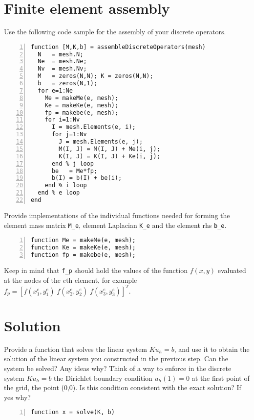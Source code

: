 \documentclass[unicode,11pt,a4paper,oneside,numbers=endperiod,openany]{scrartcl}
\begin{document}
\section{Finite element assembly}
Use the following code sample for the assembly of your discrete operators.
\begin{lstlisting}[numbers=left, numberstyle=\tiny, stepnumber=1, numbersep=10pt]
function [M,K,b] = assembleDiscreteOperators(mesh)
  N   = mesh.N;
  Ne  = mesh.Ne;
  Nv  = mesh.Nv;
  M   = zeros(N,N); K = zeros(N,N);
  b   = zeros(N,1);
  for e=1:Ne
    Me = makeMe(e, mesh);
    Ke = makeKe(e, mesh);
    fp = makebe(e, mesh);
    for i=1:Nv
      I = mesh.Elements(e, i);
      for j=1:Nv
        J = mesh.Elements(e, j);
        M(I, J) = M(I, J) + Me(i, j);
        K(I, J) = K(I, J) + Ke(i, j);
      end % j loop
      be   = Me*fp;
      b(I) = b(I) + be(i);
    end % i loop
  end % e loop
end
\end{lstlisting}
Provide implementations of the individual 
functions needed for forming the element mass matrix \lstinline+M_e+, element Laplacian \lstinline+K_e+ 
and the element rhs \lstinline+b_e+. 
\begin{lstlisting}[numbers=left, numberstyle=\tiny, stepnumber=1, numbersep=10pt, identifierstyle=\ttfamily\color{Red}\bfseries] 
function Me = makeMe(e, mesh);
function Ke = makeKe(e, mesh);
function fp = makebe(e, mesh);
\end{lstlisting}
Keep in mind that \lstinline+f_p+ should hold the values of the function $f(x,y)$
evaluated at the nodes of the $e$th element,  for example
$f_p = \left [ f(x^e_1, y^e_1) \; f(x^e_2, y^e_2) \; f(x^e_3, y^e_3)  \right ]^T$.


\section{Solution}
Provide a function that solves the linear system $K u_h = b$, and use it to obtain the solution of the linear system
you constructed in the previous step. Can the system be solved? Any ideas why? Think of a way to enforce in the discrete 
system $K u_h = b$ the Dirichlet boundary condition $u_h(1) = 0$ at the first point of the grid, the point (0,0). 
Is this condition consistent with the exact solution?
If yes why? 
\begin{lstlisting}[numbers=left, numberstyle=\tiny, stepnumber=1, numbersep=10pt, identifierstyle=\ttfamily\color{Red}\bfseries] 
function x = solve(K, b)
\end{lstlisting}
\end{document}
